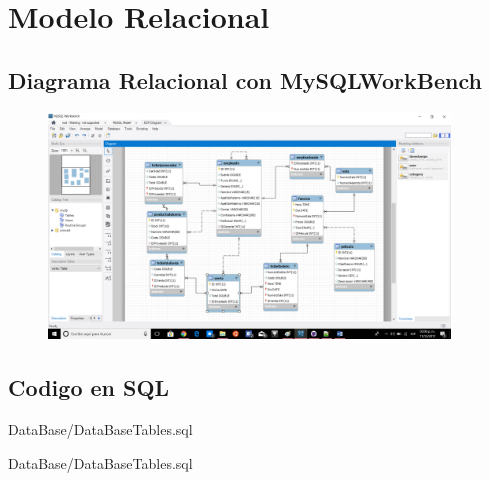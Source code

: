 \documentclass[12pt, fleqn]{report}                             %
\begin{document}
        

    \clearpage
    \section{Modelo Relacional}

        \subsection{Diagrama Relacional con MySQLWorkBench}

            \begin{figure}[h]
                \centering
                \includegraphics[width=0.95\textwidth]{25316968_2082775621968636_1083983642_o (1).png}
            \end{figure}

        \clearpage
        \subsection{Codigo en SQL}

            
            {DataBase/DataBaseTables.sql}
            \clearpage

            
            {DataBase/DataBaseTables.sql}
            \clearpage
\end{document}
